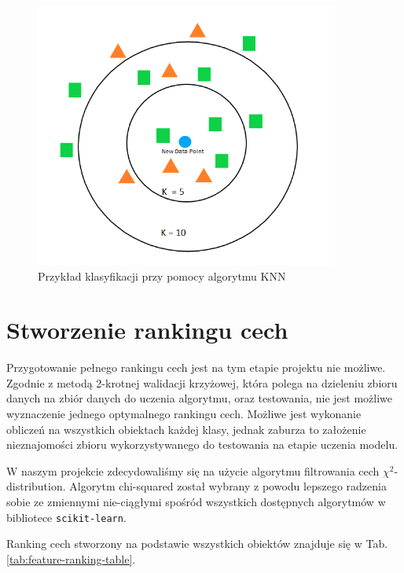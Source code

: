 \documentclass{article}
\begin{document}
\begin{figure}[h]
    \centering
    \noindent 
    \vspace{.2cm}
    \includegraphics[width=10cm]{kNN.png}
    \caption{Przykład klasyfikacji przy pomocy algorytmu KNN}
    \label{fig:knn}
\end{figure}

\newpage %

\section{Stworzenie rankingu cech}
Przygotowanie pełnego rankingu cech jest na tym etapie projektu nie możliwe. Zgodnie z metodą 2-krotnej walidacji krzyżowej, która polega na dzieleniu zbioru danych na zbiór danych do uczenia algorytmu, oraz testowania, nie jest możliwe wyznaczenie jednego optymalnego rankingu cech. Możliwe jest wykonanie obliczeń na wszystkich obiektach każdej klasy, jednak zaburza to założenie nieznajomości zbioru wykorzystywanego do testowania na etapie uczenia modelu.

W naszym projekcie zdecydowaliśmy się na użycie algorytmu filtrowania cech $\chi^2$-distribution. Algorytm chi-squared został wybrany z powodu lepszego radzenia sobie ze zmiennymi nie-ciągłymi spośród wszystkich dostępnych algorytmów w bibliotece \texttt{scikit-learn}.

Ranking cech stworzony na podstawie wszystkich obiektów znajduje się w Tab. \ref{tab:feature-ranking-table}.
\end{document}

